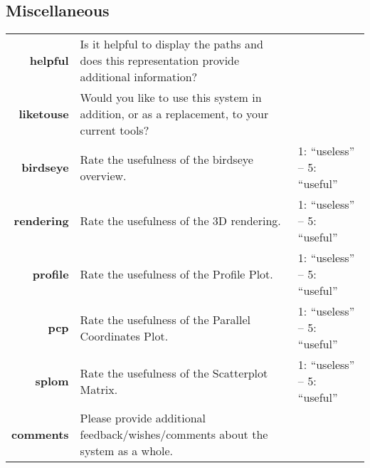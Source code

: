 \documentclass[8pt]{article}
\begin{document}
\subsection*{Miscellaneous}
\begin{longtable}{r p{15cm} l}
\hline
\textbf{helpful} & Is it helpful to display the paths and does this representation provide additional information?\\
\textbf{liketouse} & Would you like to use this system in addition, or as a replacement, to your current tools?\\
\textbf{birdseye} & Rate the usefulness of the birdseye overview. & 1: ``useless'' -- 5: ``useful''\\
\textbf{rendering} & Rate the usefulness of the 3D rendering. & 1: ``useless'' -- 5: ``useful''\\
\textbf{profile} & Rate the usefulness of the Profile Plot. & 1: ``useless'' -- 5: ``useful''\\
\textbf{pcp} & Rate the usefulness of the Parallel Coordinates Plot. & 1: ``useless'' -- 5: ``useful''\\
\textbf{splom} & Rate the usefulness of the Scatterplot Matrix. & 1: ``useless'' -- 5: ``useful''\\
\textbf{comments} & Please provide additional feedback/wishes/comments about the system as a whole.\\
\hline
\end{longtable}
\end{document}

